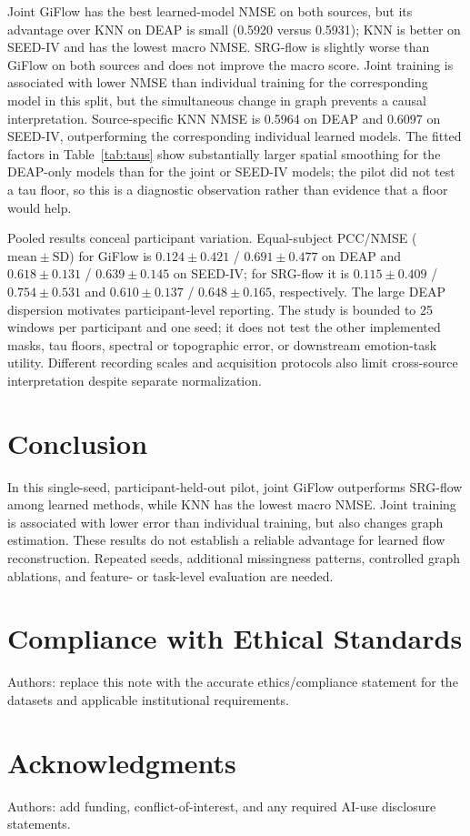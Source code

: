\documentclass{article}
\begin{document}
Joint GiFlow has the best learned-model NMSE on both sources, but its
advantage over KNN on DEAP is small (0.5920 versus 0.5931); KNN is better
on SEED-IV and has the lowest macro NMSE. SRG-flow is slightly worse than
GiFlow on both sources and does not improve the macro score. Joint training
is associated with lower NMSE than individual training for the corresponding
model in this split, but the simultaneous change in graph prevents a causal
interpretation. Source-specific KNN NMSE is 0.5964 on DEAP and 0.6097 on
SEED-IV, outperforming the corresponding individual learned models.
The fitted factors in Table~\ref{tab:taus} show substantially larger
spatial smoothing for the DEAP-only models than for the joint or SEED-IV
models; the pilot did not test a tau floor, so this is a diagnostic
observation rather than evidence that a floor would help.

Pooled results conceal participant variation. Equal-subject PCC/NMSE
($\mathrm{mean}\pm\mathrm{SD}$) for GiFlow is $0.124\pm0.421$ /
$0.691\pm0.477$ on DEAP and $0.618\pm0.131$ / $0.639\pm0.145$ on SEED-IV;
for SRG-flow it is $0.115\pm0.409$ / $0.754\pm0.531$ and
$0.610\pm0.137$ / $0.648\pm0.165$, respectively. The large DEAP dispersion
motivates participant-level reporting. The study is bounded to 25 windows
per participant and one seed; it does not test the other implemented masks,
tau floors, spectral or topographic error, or downstream emotion-task
utility. Different recording scales and acquisition protocols also limit
cross-source interpretation despite separate normalization.

\section{Conclusion}

In this single-seed, participant-held-out pilot, joint GiFlow outperforms
SRG-flow among learned methods, while KNN has the lowest macro NMSE.
Joint training is associated with lower error than individual training,
but also changes graph estimation. These results do not establish a
reliable advantage for learned flow reconstruction. Repeated seeds,
additional missingness patterns, controlled graph ablations, and
feature- or task-level evaluation are needed.

\section*{Compliance with Ethical Standards}
Authors: replace this note with the accurate ethics/compliance statement
for the datasets and applicable institutional requirements.

\section*{Acknowledgments}
Authors: add funding, conflict-of-interest, and any required AI-use
disclosure statements.



\end{document}
